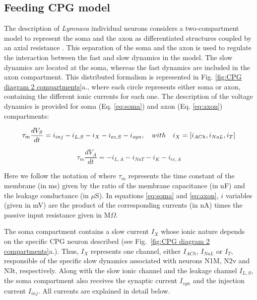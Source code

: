\subsection{Feeding CPG model}
\label{sec:CPG model equations}
The \textcite{vavoulis_dynamic_2007} description of {\sl Lymnaea} individual neurons considers a two-compartment model to represent the soma and the axon as  differentiated structures coupled by an axial resistance \parencite{vavoulis_dynamic_2007}. This separation of the soma and the axon is used to regulate the interaction between the fast and slow dynamics in the model. The slow dynamics are located at the soma, whereas the fast dynamics are included in the axon compartment. This distributed formalism is represented in Fig. \ref{fig:CPG diagram 2 compartments}a., where each circle represents either soma or axon, containing the different ionic currents for each one. The description of the voltage dynamics is provided for soma (Eq. \ref{eq:soma}) and axon (Eq. \ref{eq:axon}) compartments:

\begin{equation}
	\tau_m\frac{dV_S}{dt} = i_{inj} - i_{L,S} - i_X - i_{ec,S} - i_{syn} \\,
	\quad with \quad i_X = [i_{ACh},i_{NaL},i_T]
	\label{eq:soma}
\end{equation}

\begin{equation}
	\tau_m\frac{dV_A}{dt} = -i_{L,A} - i_{NaT} - i_K - i_{ec,A}
	\label{eq:axon}
\end{equation}

\noindent Here we follow the notation of \textcite{vavoulis_dynamic_2007} where $\tau_m$ represents the time constant of the membrane (in ms) given by the ratio of the membrane capacitance (in nF) and the leakage conductance (in $\mu$S).  In equations \ref{eq:soma} and \ref{eq:axon}, $i$ variables (given in mV) are the product of the corresponding currents (in nA) times the passive input resistance given in M$\Omega$.

The soma compartment contains a slow current $I_X$ whose ionic nature depends on the specific CPG neuron described (see Fig.~\ref{fig:CPG diagram 2 compartments}a.). Thus, $I_X$  represents one channel, either $I_{ACh}$, $I_{NaL}$ or $I_{T}$, responsible of the specific slow dynamics associated with neurons N1M, N2v and N3t, respectively.  Along with the slow ionic channel and the leakage channel  $I_{L,S}$, the soma compartment also receives the synaptic current $I_{syn}$ and the injection current $I_{inj}$. All currents are explained in detail below.

